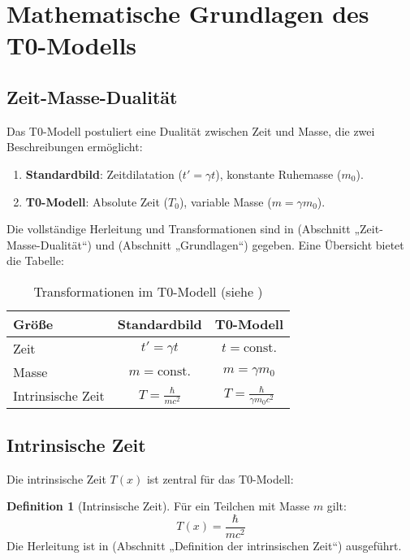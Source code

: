 \documentclass[a4paper,12pt]{article}
\theoremstyle{definition}
\newtheorem{definition}{Definition}[theorem]
\theoremstyle{remark}
\newcommand{\Tfield}{T(x)} %
\begin{document}
	\section{Mathematische Grundlagen des T0-Modells}
	
	\subsection{Zeit-Masse-Dualität}
	
	Das T0-Modell postuliert eine Dualität zwischen Zeit und Masse, die zwei Beschreibungen ermöglicht:
	\begin{enumerate}
		\item \textbf{Standardbild}: Zeitdilatation (\(t' = \gamma t\)), konstante Ruhemasse (\(m_0\)).
		\item \textbf{T0-Modell}: Absolute Zeit (\(T_0\)), variable Masse (\(m = \gamma m_0\)).
	\end{enumerate}
	Die vollständige Herleitung und Transformationen sind in \cite{pascher_params_2025} (Abschnitt „Zeit-Masse-Dualität“) und \cite{pascher_galaxies_2025} (Abschnitt „Grundlagen“) gegeben. Eine Übersicht bietet die Tabelle:
	
	\begin{table}[h]
		\centering
		\begin{tabular}{|l|c|c|}
			\hline
			\textbf{Größe} & \textbf{Standardbild} & \textbf{T0-Modell} \\
			\hline
			Zeit & \(t' = \gamma t\) & \(t = \text{const.}\) \\
			Masse & \(m = \text{const.}\) & \(m = \gamma m_0\) \\
			Intrinsische Zeit & \(T = \frac{\hbar}{m c^2}\) & \(T = \frac{\hbar}{\gamma m_0 c^2}\) \\
			\hline
		\end{tabular}
		\caption{Transformationen im T0-Modell (siehe \cite{pascher_params_2025})}
	\end{table}
	
	\subsection{Intrinsische Zeit}
	
	Die intrinsische Zeit \(\Tfield\) ist zentral für das T0-Modell:
	
	\begin{definition}[Intrinsische Zeit]
		Für ein Teilchen mit Masse \(m\) gilt:
		\begin{equation}
			\Tfield = \frac{\hbar}{m c^2}
		\end{equation}
		Die Herleitung ist in \cite{pascher_params_2025} (Abschnitt „Definition der intrinsischen Zeit“) ausgeführt.
	\end{definition}
	
\end{document}
